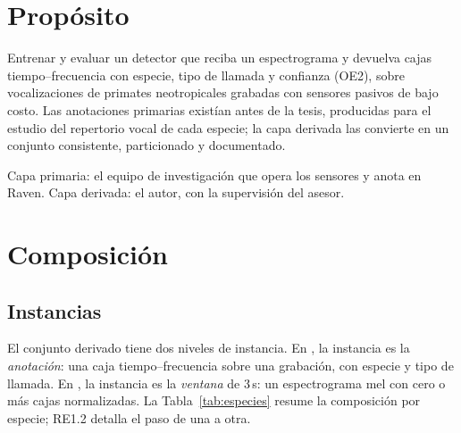 \documentclass[12pt,a4paper]{article}
\begin{document}
\section{Propósito}

 Entrenar y evaluar un detector que reciba un espectrograma y devuelva
cajas tiempo--frecuencia con especie, tipo de llamada y confianza (OE2), sobre vocalizaciones
de primates neotropicales grabadas con sensores pasivos de bajo costo. Las anotaciones
primarias existían antes de la tesis, producidas para el estudio del repertorio vocal de cada
especie; la capa derivada las convierte en un conjunto consistente, particionado y
documentado.

 Capa primaria: el equipo de investigación que opera los sensores y anota en
Raven. Capa derivada: el autor, con la supervisión del asesor.


\section{Composición}

\subsection{Instancias}

El conjunto derivado tiene dos niveles de instancia. En , la instancia es la
\emph{anotación}: una caja tiempo--frecuencia sobre una grabación, con especie y tipo de
llamada. En , la instancia es la \emph{ventana} de 3\,s: un espectrograma mel
con cero o más cajas normalizadas. La Tabla~\ref{tab:especies} resume la composición por
especie; RE1.2 detalla el paso de una a otra.
\end{document}
